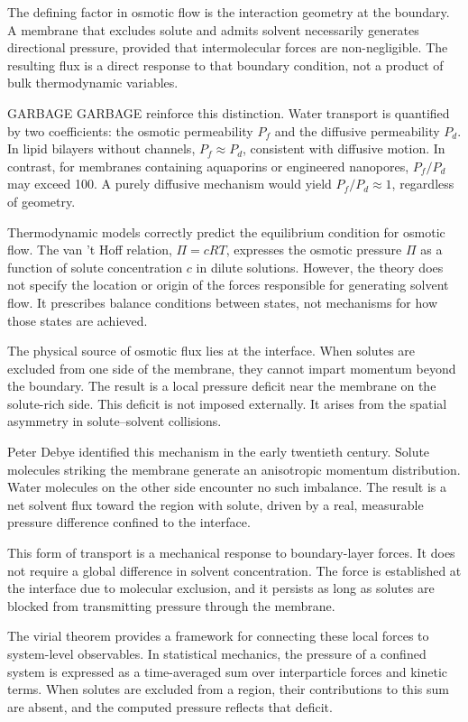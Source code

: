 The defining factor in osmotic flow is the interaction geometry at the boundary. A membrane that excludes solute and admits solvent necessarily generates directional pressure, provided that intermolecular forces are non-negligible. The resulting flux is a direct response to that boundary condition, not a product of bulk thermodynamic variables.



GARBAGE  GARBAGE reinforce this distinction. Water transport is quantified by two coefficients: the osmotic permeability $P_f$ and the diffusive permeability $P_d$. In lipid bilayers without channels, $P_f \approx P_d$, consistent with diffusive motion. In contrast, for membranes containing aquaporins or engineered nanopores, $P_f / P_d$ may exceed 100. A purely diffusive mechanism would yield $P_f / P_d \approx 1$, regardless of geometry.

Thermodynamic models correctly predict the equilibrium condition for osmotic flow. The van ’t Hoff relation, $\Pi = cRT$, expresses the osmotic pressure $\Pi$ as a function of solute concentration $c$ in dilute solutions. However, the theory does not specify the location or origin of the forces responsible for generating solvent flow. It prescribes balance conditions between states, not mechanisms for how those states are achieved.

The physical source of osmotic flux lies at the interface. When solutes are excluded from one side of the membrane, they cannot impart momentum beyond the boundary. The result is a local pressure deficit near the membrane on the solute-rich side. This deficit is not imposed externally. It arises from the spatial asymmetry in solute–solvent collisions.

Peter Debye identified this mechanism in the early twentieth century. Solute molecules striking the membrane generate an anisotropic momentum distribution. Water molecules on the other side encounter no such imbalance. The result is a net solvent flux toward the region with solute, driven by a real, measurable pressure difference confined to the interface.

This form of transport is a mechanical response to boundary-layer forces. It does not require a global difference in solvent concentration. The force is established at the interface due to molecular exclusion, and it persists as long as solutes are blocked from transmitting pressure through the membrane.

The virial theorem provides a framework for connecting these local forces to system-level observables. In statistical mechanics, the pressure of a confined system is expressed as a time-averaged sum over interparticle forces and kinetic terms. When solutes are excluded from a region, their contributions to this sum are absent, and the computed pressure reflects that deficit.

